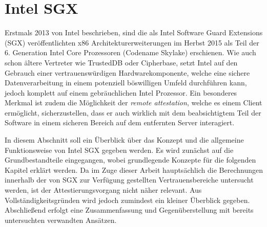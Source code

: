 \section{Intel SGX}
Erstmals 2013 von Intel beschrieben, sind die als Intel Software Guard Extensions (SGX) veröffentlichten x86 Architekturerweiterungen im Herbst 2015 als Teil der 6. Generation Intel Core Prozessoren (Codename Skylake) erschienen. Wie auch schon ältere Vertreter wie TrustedDB oder Cipherbase, setzt Intel auf den Gebrauch einer vertrauenswürdigen Hardwarekomponente, welche eine sichere Datenverarbeitung in einem potenziell böswilligen Umfeld durchführen kann, jedoch komplett auf einem gebräuchlichen Intel Prozessor. Ein besonderes Merkmal ist zudem die Möglichkeit der \textit{remote attestation}, welche es einem Client ermöglicht, sicherzustellen, dass er auch wirklich mit dem beabsichtigtem Teil der Software in einem sicheren Bereich auf dem entfernten Server interagiert. 

In diesem Abschnitt soll ein Überblick über das Konzept und die allgemeine Funktionsweise von Intel SGX gegeben werden. Es wird zunächst auf die Grundbestandteile eingegangen, wobei grundlegende Konzepte für die folgenden Kapitel erklärt werden. Da im Zuge dieser Arbeit hauptsächlich die Berechnungen innerhalb der von SGX zur Verfügung gestellten Vertrauensbereiche untersucht werden, ist der Attestierungsvorgang nicht näher relevant. Aus Vollständigkeitsgründen wird jedoch zumindest ein kleiner Überblick gegeben. Abschließend erfolgt eine Zusammenfassung und Gegenüberstellung mit bereits untersuchten verwandten Ansätzen.

